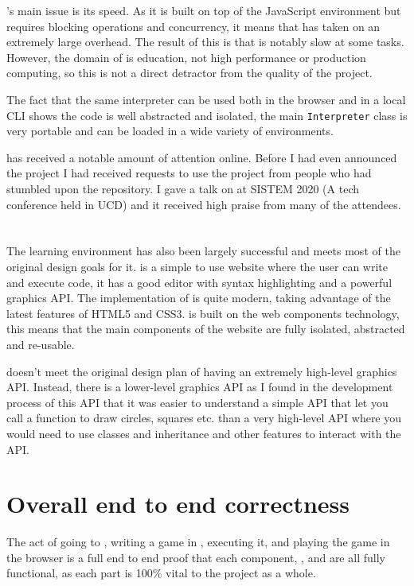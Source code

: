 \Setanta{}'s main issue is its speed. As it is built on top of the JavaScript environment but requires blocking operations and concurrency, it means that \Setanta{} has taken on an extremely large overhead. The result of this is that \Setanta{} is notably slow at some tasks. However, the domain of \Setanta{} is education, not high performance or production computing, so this is not a direct detractor from the quality of the project.

The fact that the same \Setanta{} interpreter can be used both in the browser and in a local CLI shows the code is well abstracted and isolated, the main \lstinline|Interpreter| class is very portable and can be loaded in a wide variety of environments.

\Setanta{} has received a notable amount of attention online. Before I had even announced the project I had received requests to use the project from people who had stumbled upon the repository. I gave a talk on \Setanta{} at SISTEM 2020 (A tech conference held in UCD) and it received high praise from many of the attendees.

\section{\trys{}}

The \trys{} learning environment has also been largely successful and meets most of the original design goals for it. \trys{} is a simple to use website where the user can write and execute \Setanta{} code, it has a good editor with syntax highlighting and a powerful graphics API.
The implementation of \trys{} is quite modern, taking advantage of the latest features of HTML5 and CSS3. \trys{} is built on the web components technology, this means that the main components of the \trys{} website are fully isolated, abstracted and re-usable.

\trys{} doesn't meet the original design plan of having an extremely high-level graphics API. Instead, there is a lower-level graphics API as I found in the development process of this API that it was easier to understand a simple API that let you call a function to draw circles, squares etc. than a very high-level API where you would need to use classes and inheritance and other features to interact with the API.

\section{Overall end to end correctness}

The act of going to \trys{}, writing a game in \Setanta{}, executing it, and playing the game in the browser is a full end to end proof that each component, \trys{}, \Setanta{} and \tsPEG{} are all fully functional, as each part is 100\% vital to the project as a whole.
